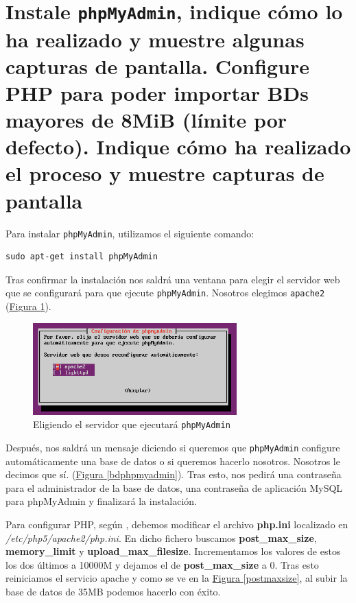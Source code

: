 \documentclass[10pt,a4paper,spanish]{article}
\numberwithin{equation}{section} %
\numberwithin{figure}{section} %
\numberwithin{table}{section} %
\begin{document}
\section{Instale \texttt{phpMyAdmin}, indique cómo lo ha realizado y muestre algunas capturas de pantalla. Configure PHP para poder importar BDs mayores de 8MiB (límite por defecto). Indique cómo ha realizado el proceso y muestre capturas de pantalla}
Para instalar \texttt{phpMyAdmin}, utilizamos el siguiente comando:

\begin{verbatim}
sudo apt-get install phpMyAdmin
\end{verbatim}

Tras confirmar la instalación nos saldrá una ventana para elegir el servidor web que se configurará para que ejecute \texttt{phpMyAdmin}. Nosotros elegimos \texttt{apache2} (\hyperref[serverphpmyadmin]{Figura \ref*{serverphpmyadmin}}).

\begin{figure}[!h]
    \centering
    \includegraphics[width=0.7\textwidth]{34}
    \caption{Eligiendo el servidor que ejecutará \texttt{phpMyAdmin}}
    \label{serverphpmyadmin}
\end{figure}

Después, nos saldrá un mensaje diciendo si queremos que \texttt{phpMyAdmin} configure automáticamente una base de datos o si queremos hacerlo nosotros. Nosotros le decimos que sí. (\hyperref[bdphpmyadmin]{Figura \ref*{bdphpmyadmin}}). Tras esto, nos pedirá una contraseña para el administrador de la base de datos, una contraseña de aplicación MySQL para phpMyAdmin y finalizará la instalación.


Para configurar PHP, según \cite{phpini}, debemos modificar el archivo \textbf{php.ini} localizado en \textit{/etc/php5/apache2/php.ini}. En dicho fichero buscamos \textbf{post\_max\_size}, \textbf{memory\_limit} y \textbf{upload\_max\_filesize}. Incrementamos los valores de estos los dos últimos a 10000M y dejamos el de \textbf{post\_max\_size} a 0. Tras esto reiniciamos el servicio apache y como se ve en la \hyperref[postmaxsize]{Figura \ref*{postmaxsize}}, al subir la base de datos de 35MB podemos hacerlo con éxito.
\end{document}
